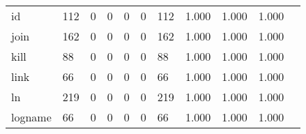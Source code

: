 \begin{longtable}{lp{1.2cm}p{1.2cm}p{1.2cm}p{1.2cm}p{1.2cm}p{1.2cm}p{1.2cm}p{1.2cm}p{1.2cm}p{1.2cm}}
id        &                                   112 &                                                  0 &                                                  0 &                                                  0 &                                                  0 &                                                112 &                                              1.000 &                                              1.000 &                                              1.000 \\
join      &                                   162 &                                                  0 &                                                  0 &                                                  0 &                                                  0 &                                                162 &                                              1.000 &                                              1.000 &                                              1.000 \\
kill      &                                    88 &                                                  0 &                                                  0 &                                                  0 &                                                  0 &                                                 88 &                                              1.000 &                                              1.000 &                                              1.000 \\
link      &                                    66 &                                                  0 &                                                  0 &                                                  0 &                                                  0 &                                                 66 &                                              1.000 &                                              1.000 &                                              1.000 \\
ln        &                                   219 &                                                  0 &                                                  0 &                                                  0 &                                                  0 &                                                219 &                                              1.000 &                                              1.000 &                                              1.000 \\
logname   &                                    66 &                                                  0 &                                                  0 &                                                  0 &                                                  0 &                                                 66 &                                              1.000 &                                              1.000 &                                              1.000 \\

\end{longtable}
